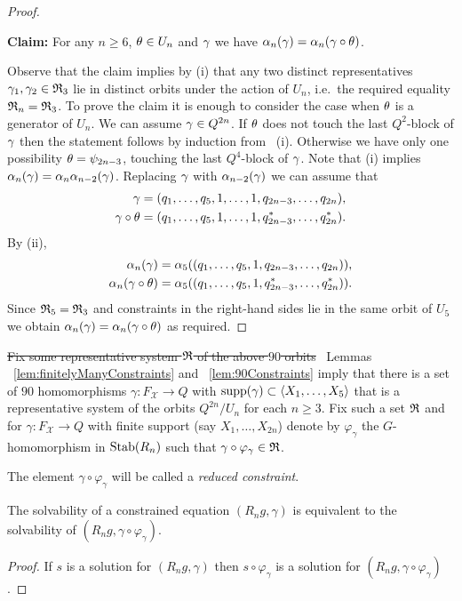 \documentclass[a4paper,11pt]{amsart}
\newcommand\replace[2]{\st{#1}{\color{Green4}\ #2}}
\begin{document}
\begin{proof}
{{\begin{trivlist}
\item{\bf Claim:} 
For any $n \ge 6$, $\theta \in U_n$ and $\gamma$ we have $\alpha_n(\gamma) = \alpha_n(\gamma \circ \theta)$.
\end{trivlist}

Observe that the claim implies by (i) that any two distinct representatives $\gamma_1,\gamma_2 \in \mathfrak{R}_3$ lie in 
distinct orbits under the action of $U_n$, i.e.\ the required equality $\mathfrak{R}_n = \mathfrak{R}_3$.
To prove the claim it is enough to consider the case when $\theta$ is a generator of $U_n$.
We can assume $\gamma \in Q^{2n}$.
If $\theta$ does not touch the last $Q^2$-block of $\gamma$ then the statement follows by induction from ~(i).
Otherwise we have only one possibility $\theta = \psi_{2n-3}$, touching the last $Q^4$-block of $\gamma$.
Note that (i) implies $\alpha_{n}(\gamma) = \alpha_{n}\alpha_{n-2}(\gamma)$.
Replacing $\gamma$ with $\alpha_{n-2}(\gamma)$ we can assume that
\begin{align*}
  \gamma &= (q_1,\dots,q_5,1,\dots,1,q_{2n-3},\dots,q_{2n}), \\
  \gamma\circ\theta &= (q_1,\dots,q_5,1,\dots,1,q_{2n-3}^*,\dots,q_{2n}^*).
\end{align*}
By (ii),
\begin{align*}
  \alpha_n(\gamma) &= \alpha_{5} ((q_1,\dots,q_5,1,q_{2n-3},\dots,q_{2n})), \\
  \alpha_n(\gamma\circ\theta) &= \alpha_{5} ((q_1,\dots,q_5,1,q_{2n-3}^*,\dots,q_{2n}^*)).
\end{align*}
Since $\mathfrak{R}_5 = \mathfrak{R}_3$ and constraints in the right-hand sides lie in the same orbit of $U_5$ we obtain
$\alpha_n(\gamma) = \alpha_n(\gamma \circ \theta)$ as required.
}
}
\end{proof}
\replace{Fix some representative system $\mathfrak{R}$ of the above $90$ orbits}{
  Lemmas ~\ref{lem:finitelyManyConstraints} and ~\ref{lem:90Constraints} imply that 
  there is a set of $90$ homomorphisms $\gamma : F_{\mathcal{X}} \to Q$
  with $\operatorname{{supp}}(\gamma) \subset \left<X_1,\ldots, X_5\right>$ that is a representative system of
  the orbits $Q^{2n} / U_n$ for each $n \ge 3$.
  Fix such a set $\mathfrak{R}$
}
and for
$\gamma \colon F_{\mathcal{X}} \to Q$ with finite support (say
$X_1,\dots,X_{2n}$) denote by $\varphi_\gamma$ the $G$-homomorphism in
$\operatorname{Stab}(R_n)$ such that $\gamma\circ \varphi_\gamma \in \mathfrak{R}$.
 
 The element $\gamma \circ \varphi_\gamma$ will be called a \emph{reduced constraint}.

\begin{lem} \label{lem:solvabilityWithReducedConstraint}
 The solvability of a constrained equation $(R_n g,\gamma)$ is equivalent to the 
 solvability of $(R_n g,\gamma\circ \varphi_\gamma)$.
\end{lem}
 \begin{proof}
 If $s$ is a solution for $(R_n g,\gamma)$ then $s\circ \varphi_\gamma$ is
 a solution for $(R_n g,\gamma\circ \varphi_\gamma)$. 
\end{proof}
\end{document}
